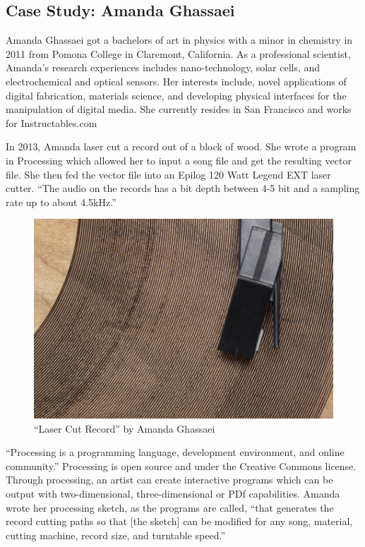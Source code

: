 \documentclass[12pt singlecol]{article}
\begin{document}
\begin{flushleft}
\subsection{Case Study: Amanda Ghassaei}

Amanda Ghassaei got a bachelors of art in physics with a minor in chemistry in 2011 from Pomona College in Claremont, California. As a professional scientist, Amanda's research experiences includes nano-technology, solar cells, and electrochemical and optical sensors. Her interests include, novel applications of digital fabrication, materials science, and developing physical interfaces for the manipulation of digital media. She currently resides in San Francisco and works for Instructables.com \cite{ghassaei13}

In 2013, Amanda laser cut a record out of a block of wood. She wrote a program in Processing which allowed her to input a song file and get the resulting vector file. She then fed the vector file into an Epilog 120 Watt Legend EXT laser cutter. ``The audio on the records has a bit depth between 4-5 bit and a sampling rate up to about 4.5kHz.'' \cite{EpilogMain09, processing13, ghassaei13} 

\begin{figure}
  \centering  
  \includegraphics[width=\linewidth]{amanda1}
  \caption{``Laser Cut Record'' by Amanda Ghassaei \cite{ghassaei13}}
  \label{fig:amanda1}
\end{figure}	

``Processing is a programming language, development environment, and online community.'' \cite{processing13} Processing is open source and under the Creative Commons license. Through processing, an artist can create interactive programs which can be output with two-dimensional, three-dimensional or PDf capabilities. Amanda wrote her processing sketch, as the programs are called, ``that generates the record cutting paths so that [the sketch] can be modified for any song, material, cutting machine, record size, and turntable speed.'' \cite{instruct13}


\end{flushleft}
\end{document}
